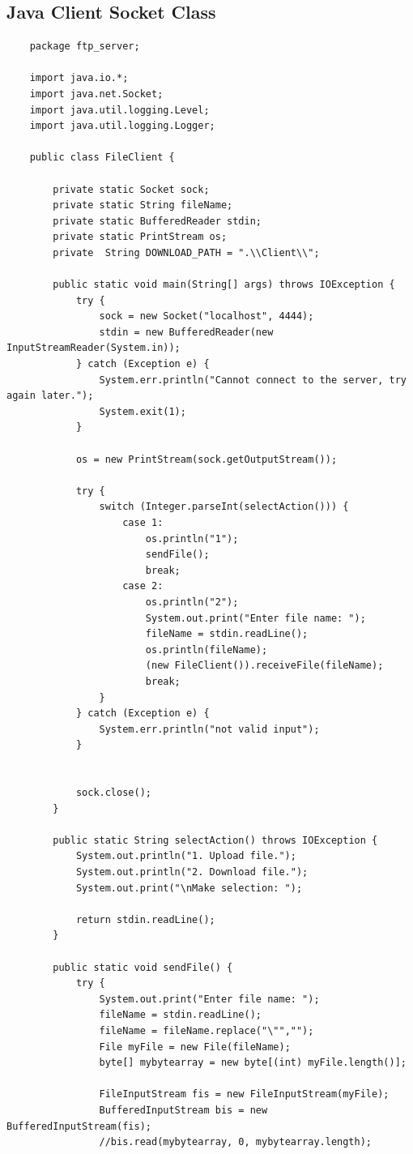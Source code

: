 \documentclass[12pt]{article}
\begin{document}
\subsection{Java Client Socket Class}
\begin{verbatim}
	package ftp_server;

	import java.io.*;
	import java.net.Socket;
	import java.util.logging.Level;
	import java.util.logging.Logger;
	
	public class FileClient {
	
		private static Socket sock;
		private static String fileName;
		private static BufferedReader stdin;
		private static PrintStream os;
		private  String DOWNLOAD_PATH = ".\\Client\\";
	
		public static void main(String[] args) throws IOException {
			try {
				sock = new Socket("localhost", 4444);
				stdin = new BufferedReader(new InputStreamReader(System.in));
			} catch (Exception e) {
				System.err.println("Cannot connect to the server, try again later.");
				System.exit(1);
			}
	
			os = new PrintStream(sock.getOutputStream());
	
			try {
				switch (Integer.parseInt(selectAction())) {
					case 1:
						os.println("1");
						sendFile();
						break;
					case 2:
						os.println("2");
						System.out.print("Enter file name: ");
						fileName = stdin.readLine();
						os.println(fileName);
						(new FileClient()).receiveFile(fileName);
						break;
				}
			} catch (Exception e) {
				System.err.println("not valid input");
			}
	
	
			sock.close();
		}
	
		public static String selectAction() throws IOException {
			System.out.println("1. Upload file.");
			System.out.println("2. Download file.");
			System.out.print("\nMake selection: ");
	
			return stdin.readLine();
		}
	
		public static void sendFile() {
			try {
				System.out.print("Enter file name: ");
				fileName = stdin.readLine();
				fileName = fileName.replace("\"","");
				File myFile = new File(fileName);
				byte[] mybytearray = new byte[(int) myFile.length()];
	
				FileInputStream fis = new FileInputStream(myFile);
				BufferedInputStream bis = new BufferedInputStream(fis);
				//bis.read(mybytearray, 0, mybytearray.length);
	

\end{verbatim}
\end{document}
